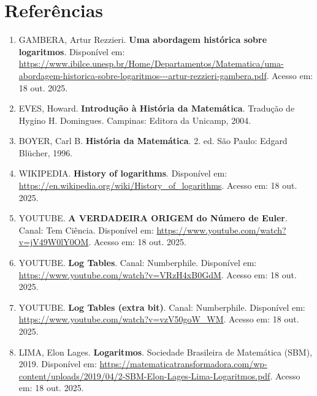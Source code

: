 \section*{Referências}

\begin{enumerate}
    \item GAMBERA, Artur Rezzieri. \textbf{Uma abordagem histórica sobre logaritmos}. Disponível em: \url{https://www.ibilce.unesp.br/Home/Departamentos/Matematica/uma-abordagem-historica-sobre-logaritmos---artur-rezzieri-gambera.pdf}. Acesso em: 18 out. 2025.

    \item EVES, Howard. \textbf{Introdução à História da Matemática}. Tradução de Hygino H. Domingues. Campinas: Editora da Unicamp, 2004.

    \item BOYER, Carl B. \textbf{História da Matemática}. 2. ed. São Paulo: Edgard Blücher, 1996.


    \item WIKIPEDIA. \textbf{History of logarithms}. Disponível em: \url{https://en.wikipedia.org/wiki/History_of_logarithms}. Acesso em: 18 out. 2025.


    \item YOUTUBE. \textbf{A VERDADEIRA ORIGEM do Número de Euler}. Canal: Tem Ciência. Disponível em: \url{https://www.youtube.com/watch?v=jV49W0lY0OM}. Acesso em: 18 out. 2025.

    \item YOUTUBE. \textbf{Log Tables}. Canal: Numberphile. Disponível em: \url{https://www.youtube.com/watch?v=VRzH4xB0GdM}. Acesso em: 18 out. 2025.

    \item YOUTUBE. \textbf{Log Tables (extra bit)}. Canal: Numberphile. Disponível em: \url{https://www.youtube.com/watch?v=vzV50goW_WM}. Acesso em: 18 out. 2025.

    \item LIMA, Elon Lages. \textbf{Logaritmos}. Sociedade Brasileira de Matemática (SBM), 2019. Disponível em: \url{https://matematicatransformadora.com/wp-content/uploads/2019/04/2-SBM-Elon-Lages-Lima-Logaritmos.pdf}. Acesso em: 18 out. 2025.


\end{enumerate}
